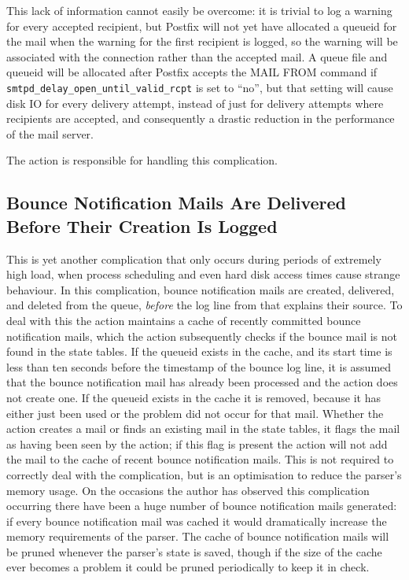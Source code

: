 This lack of information cannot easily be overcome: it is trivial to log a
warning for every accepted recipient, but Postfix will not yet have
allocated a queueid for the mail when the warning for the first recipient
is logged, so the warning will be associated with the connection rather
than the accepted mail.  A queue file and queueid will be allocated after
Postfix accepts the MAIL FROM command if
\texttt{smtpd\_delay\_open\_until\_valid\_rcpt} is set to ``no'', but that
setting will cause disk IO for every delivery attempt, instead of just for
delivery attempts where recipients are accepted, and consequently a drastic
reduction in the performance of the mail server.

The  action is responsible for handling this complication.

\subsection{Bounce Notification Mails Are Delivered Before Their Creation
Is Logged}

\label{Bounce notification mails delivered before their creation is logged}

This is yet another complication that only occurs during periods of
extremely high load, when process scheduling and even hard disk access
times cause strange behaviour.  In this complication, bounce notification
mails are created, delivered, and deleted from the queue, \textit{before\/}
the log line from  that explains their source.  To deal with
this the  action maintains a cache of recently committed
bounce notification mails, which the  action
subsequently checks if the bounce mail is not found in the state tables.
If the queueid exists in the cache, and its start time is less than ten
seconds before the timestamp of the bounce log line, it is assumed that the
bounce notification mail has already been processed and the
 action does not create one.  If the queueid exists
in the cache it is removed, because it has either just been used or the
problem did not occur for that mail.  Whether the 
action creates a mail or finds an existing mail in the state tables, it
flags the mail as having been seen by the  action;
if this flag is present the  action will not add the mail to
the cache of recent bounce notification mails.  This is not required to
correctly deal with the complication, but is an optimisation to reduce the
parser's memory usage.  On the occasions the author has observed this
complication occurring there have been a huge number of bounce notification
mails generated: if every bounce notification mail was cached it would
dramatically increase the memory requirements of the parser.  The cache of
bounce notification mails will be pruned whenever the parser's state is
saved, though if the size of the cache ever becomes a problem it could be
pruned periodically to keep it in check.

